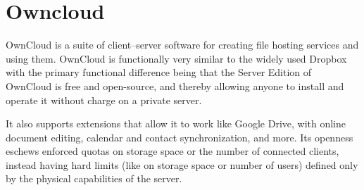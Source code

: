 \section{Owncloud}
OwnCloud is a suite of client–server software for creating file hosting services
and using them. OwnCloud is functionally very similar to the widely used Dropbox
with the primary functional difference being that the Server Edition of OwnCloud
is free and open-source, and thereby allowing anyone to install and operate it
without charge on a private server.

It also supports extensions that allow it to work like Google Drive, with online
document editing, calendar and contact synchronization, and more. Its openness
eschews enforced quotas on storage space or the number of connected clients,
instead having hard limits (like on storage space or number of users) defined
only by the physical capabilities of the server.\cite{Owncloud}